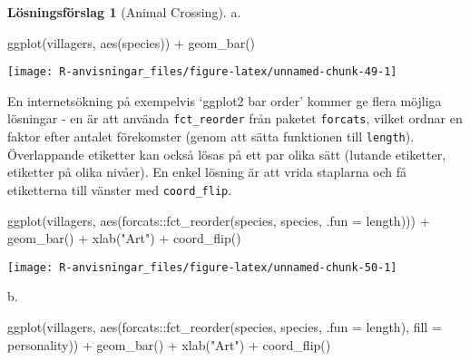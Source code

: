 \documentclass[
]{book}
\newenvironment{Shaded}{\begin{snugshade}}{\end{snugshade}}
\newcommand{\AttributeTok}[1]{\textcolor[rgb]{0.77,0.63,0.00}{#1}}
\newcommand{\FunctionTok}[1]{\textcolor[rgb]{0.00,0.00,0.00}{#1}}
\newcommand{\NormalTok}[1]{#1}
\newcommand{\SpecialCharTok}[1]{\textcolor[rgb]{0.00,0.00,0.00}{#1}}
\newcommand{\StringTok}[1]{\textcolor[rgb]{0.31,0.60,0.02}{#1}}
\theoremstyle{definition}
\theoremstyle{definition}
\theoremstyle{definition}
\theoremstyle{definition}
\newtheorem{hypothesis}{Lösningsförslag}[chapter]
\theoremstyle{remark}
\begin{document}
\begin{hypothesis}[Animal Crossing]
a.

\begin{Shaded}
\begin{Highlighting}[]
\FunctionTok{ggplot}\NormalTok{(villagers, }\FunctionTok{aes}\NormalTok{(species)) }\SpecialCharTok{+}
  \FunctionTok{geom\_bar}\NormalTok{()}
\end{Highlighting}
\end{Shaded}

\begin{center}\texttt{[image: R-anvisningar\_files/figure-latex/unnamed-chunk-49-1]} \end{center}

En internetsökning på exempelvis `ggplot2 bar order' kommer ge flera möjliga lösningar - en är att använda \texttt{fct\_reorder} från paketet \texttt{forcats}, vilket ordnar en faktor efter antalet förekomster (genom att sätta funktionen till \texttt{length}).
Överlappande etiketter kan också lösas på ett par olika sätt (lutande etiketter, etiketter på olika nivåer). En enkel lösning är att vrida staplarna och få etiketterna till vänster med \texttt{coord\_flip}.

\begin{Shaded}
\begin{Highlighting}[]
\FunctionTok{ggplot}\NormalTok{(villagers, }\FunctionTok{aes}\NormalTok{(forcats}\SpecialCharTok{::}\FunctionTok{fct\_reorder}\NormalTok{(species, species, }\AttributeTok{.fun =}\NormalTok{ length))) }\SpecialCharTok{+}
  \FunctionTok{geom\_bar}\NormalTok{() }\SpecialCharTok{+}
  \FunctionTok{xlab}\NormalTok{(}\StringTok{"Art"}\NormalTok{) }\SpecialCharTok{+}
  \FunctionTok{coord\_flip}\NormalTok{()}
\end{Highlighting}
\end{Shaded}

\begin{center}\texttt{[image: R-anvisningar\_files/figure-latex/unnamed-chunk-50-1]} \end{center}

b.

\begin{Shaded}
\begin{Highlighting}[]
\FunctionTok{ggplot}\NormalTok{(villagers, }\FunctionTok{aes}\NormalTok{(forcats}\SpecialCharTok{::}\FunctionTok{fct\_reorder}\NormalTok{(species, species, }\AttributeTok{.fun =}\NormalTok{ length), }\AttributeTok{fill =}\NormalTok{ personality)) }\SpecialCharTok{+}
  \FunctionTok{geom\_bar}\NormalTok{() }\SpecialCharTok{+}
  \FunctionTok{xlab}\NormalTok{(}\StringTok{"Art"}\NormalTok{) }\SpecialCharTok{+}
  \FunctionTok{coord\_flip}\NormalTok{()}
\end{Highlighting}
\end{Shaded}


\end{hypothesis}
\end{document}
